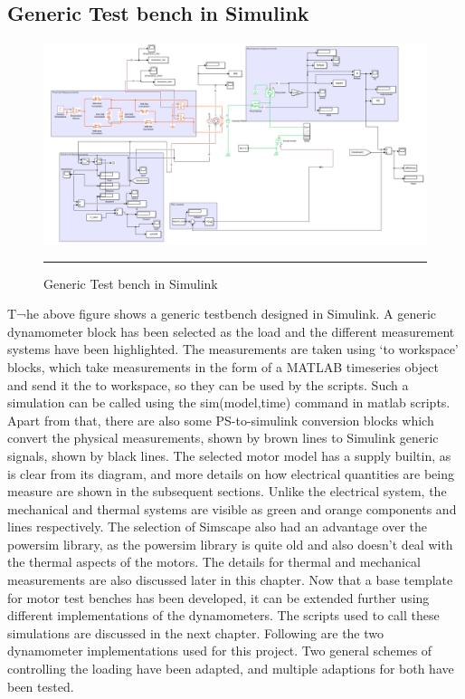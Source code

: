 \subsection{Generic Test bench in Simulink}
\begin{figure}[htbp]
	\centering
		\includegraphics[width = 4.5in]{./Figures/MS/fig332.png}
		\rule{35em}{0.5pt}
	\caption{Generic Test bench in Simulink}
	\label{fig:Generic Test bench in Simulink}
\end{figure}
T¬he above figure shows a generic testbench designed in Simulink. A generic dynamometer block has been selected as the load and the different measurement systems have been highlighted. The measurements are taken using ‘to workspace’ blocks, which take measurements in the form of a MATLAB timeseries object and send it the to workspace, so they can be used by the scripts. Such a simulation can be called using the sim(model,time) command in matlab scripts. Apart from that, there are also some PS-to-simulink conversion blocks which convert the physical measurements, shown by brown lines to Simulink generic signals, shown by black lines. The selected motor model has a supply builtin, as is clear from its diagram, and more details on how electrical quantities are being measure are shown in the subsequent sections. Unlike the electrical system, the mechanical and thermal systems are visible as green and orange components and lines respectively. The selection of Simscape also had an advantage over the powersim library, as the powersim library is quite old and also doesn’t deal with the thermal aspects of the motors. The details for thermal and mechanical measurements are also discussed later in this chapter. Now that a base template for motor test benches has been developed, it can be extended further using different implementations of the dynamometers. The scripts used to call these simulations are discussed in the next chapter. Following are the two dynamometer implementations used for this project. Two general schemes of controlling the loading have been adapted, and multiple adaptions for both have been tested.


